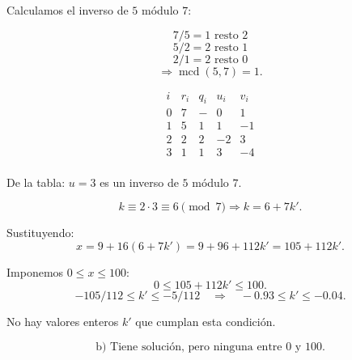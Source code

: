 \documentclass[a4paper,12pt]{article}
\begin{document}
\begin{ejercicio}[title=Ejercicio 39]

Calculamos el inverso de $5$ módulo $7$:

\[
7 / 5 = 1 \text{ resto } 2
\]
\[
5 / 2 = 2 \text{ resto } 1
\]
\[
2 / 1 = 2 \text{ resto } 0
\]
\[
\Rightarrow \operatorname{mcd}(5,7) = \boxed{1}.
\]

\[
\begin{array}{c|c|c|c|c}
i & r_i & q_i & u_i & v_i \\ \hline
0 & 7 & - & 0 & 1 \\
1 & 5 & 1 & 1 & -1 \\
2 & 2 & 2 & -2 & 3 \\
3 & \boxed{1} & 1 & 3 & -4 \\
\end{array}
\]

De la tabla: $u = 3$ es un inverso de $5$ módulo $7$.

\[
k \equiv 2\cdot 3 \equiv 6 \pmod{7} \Rightarrow k = 6 + 7k'.
\]

Sustituyendo:
\[
x = 9 + 16(6 + 7k') = 9 + 96 + 112k' = 105 + 112k'.
\]

Imponemos $0 \le x \le 100$:
\[
0 \le 105 + 112k' \le 100.
\]
\[
-105/112 \le k' \le -5/112 \quad\Rightarrow\quad -0.93 \le k' \le -0.04.
\]

No hay valores enteros $k'$ que cumplan esta condición.

\[
\boxed{\text{b) Tiene solución, pero ninguna entre 0 y 100.}}
\]
\end{ejercicio}
\end{document}
